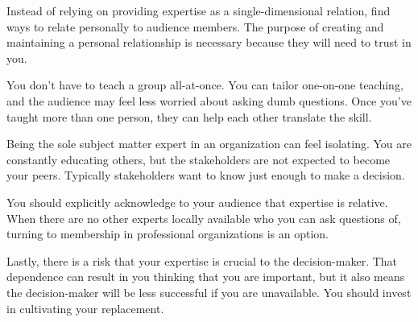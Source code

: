 Instead of relying on providing expertise as a single-dimensional relation, find ways to relate personally to audience members. The purpose of creating and maintaining a personal relationship is necessary because they will need to trust in you.


You don't have to teach a group all-at-once. You can tailor one-on-one teaching, and the audience may feel less worried about asking dumb questions.
Once you've taught more than one person, they can help each other translate the skill. 


Being the sole subject matter expert in an organization can feel isolating. You are constantly educating others, but the stakeholders are not expected to become your peers. Typically stakeholders want to know just enough to make a decision. 

You should explicitly acknowledge to your audience that expertise is relative. When there are no other experts locally available who you can ask questions of, turning to membership in professional organizations is an option.

Lastly, there is a risk that your expertise is crucial to the decision-maker. That dependence can result in you thinking that you are important, but it also means the decision-maker will be less successful if you are unavailable. You should invest in cultivating your replacement. 
